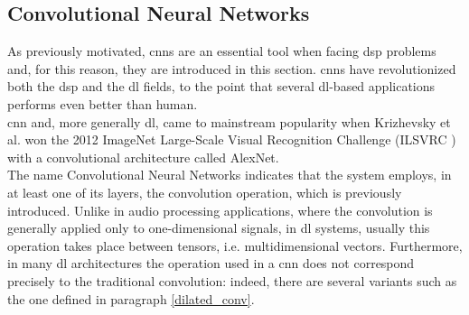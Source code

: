 \subsection{Convolutional Neural Networks} \label{cnns}
As previously motivated, \gls{cnn}s are an essential tool when facing \gls{dsp} problems and, for this reason, they are introduced in this section. \gls{cnn}s have revolutionized both the \gls{dsp} and the \gls{dl} fields, to the point that several \gls{dl}-based applications performs even better than human. \\ \gls{cnn} and, more generally \gls{dl}, came to mainstream popularity when Krizhevsky et al. \cite{krizhevsky2012imagenet} won the 2012 ImageNet Large-Scale Visual Recognition Challenge (ILSVRC \cite{ILSVRC15}) with a convolutional architecture called AlexNet. \\
The name Convolutional Neural Networks indicates that the system employs, in at least one of its layers, the convolution operation, which is previously introduced. Unlike in audio processing applications, where the convolution is generally applied only to one-dimensional signals, in \gls{dl} systems, usually this operation takes place between tensors, i.e. multidimensional vectors. Furthermore, in many \gls{dl} architectures the operation used in a \gls{cnn} does not correspond precisely to the traditional convolution: indeed, there are several variants such as the one defined in paragraph \ref{dilated_conv}. \\
